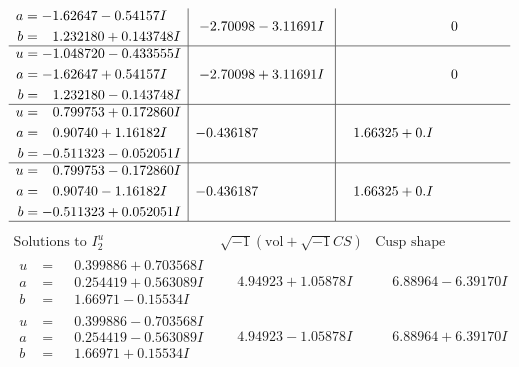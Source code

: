 \documentclass[1p]{elsarticle_modified}
\theoremstyle{definition}
\newcommand{\I}{\sqrt{-1}}
\begin{document}
$$\begin{array}{c|c|c}
\begin{aligned}
a &= -1.62647 - 0.54157 I \\
b &= \phantom{-}1.232180 + 0.143748 I\end{aligned}
 & -2.70098 - 3.11691 I & \phantom{-0.000000 } 0 \\ \hline\begin{aligned}
u &= -1.048720 - 0.433555 I \\
a &= -1.62647 + 0.54157 I \\
b &= \phantom{-}1.232180 - 0.143748 I\end{aligned}
 & -2.70098 + 3.11691 I & \phantom{-0.000000 } 0 \\ \hline\begin{aligned}
u &= \phantom{-}0.799753 + 0.172860 I \\
a &= \phantom{-}0.90740 + 1.16182 I \\
b &= -0.511323 - 0.052051 I\end{aligned}
 & -0.436187\phantom{ +0.000000I} & \phantom{-}1.66325 + 0. I\phantom{ +0.000000I} \\ \hline\begin{aligned}
u &= \phantom{-}0.799753 - 0.172860 I \\
a &= \phantom{-}0.90740 - 1.16182 I \\
b &= -0.511323 + 0.052051 I\end{aligned}
 & -0.436187\phantom{ +0.000000I} & \phantom{-}1.66325 + 0. I\phantom{ +0.000000I}\\
 \hline 
 \end{array}$$\newpage$$\begin{array}{c|c|c}  
\text{Solutions to }I^u_{2}& \I (\text{vol} + \sqrt{-1}CS) & \text{Cusp shape}\\
 \hline 
\begin{aligned}
u &= \phantom{-}0.399886 + 0.703568 I \\
a &= \phantom{-}0.254419 + 0.563089 I \\
b &= \phantom{-}1.66971 - 0.15534 I\end{aligned}
 & \phantom{-}4.94923 + 1.05878 I & \phantom{-}6.88964 - 6.39170 I \\ \hline\begin{aligned}
u &= \phantom{-}0.399886 - 0.703568 I \\
a &= \phantom{-}0.254419 - 0.563089 I \\
b &= \phantom{-}1.66971 + 0.15534 I\end{aligned}
 & \phantom{-}4.94923 - 1.05878 I & \phantom{-}6.88964 + 6.39170 I \\ \hline\begin{aligned}

\end{aligned}
\end{array}$$
\end{document}
